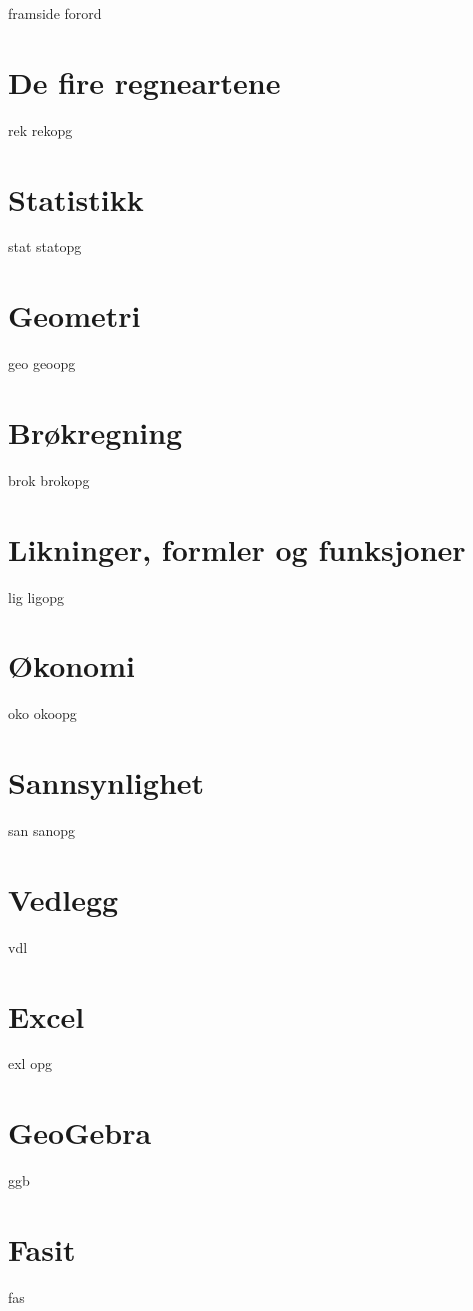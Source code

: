 




{framside}
{forord}

\tableofcontents
\chapter{De fire regneartene}
\newpage
{rek}
{rekopg}

\chapter{Statistikk}
\newpage
{stat}
{statopg}

\chapter{Geometri}
{geo}
{geoopg}

\chapter{Brøkregning \label{Br}}
\newpage
{brok}
\newpage
{brokopg}

\chapter{Likninger, formler og funksjoner \label{Lig}}
{lig}
{ligopg}


\chapter{Økonomi \label{Oko}}
{oko}
{okoopg}

\chapter{Sannsynlighet \label{San}} 
{san}
{sanopg}

\newpage


\chapter*{Vedlegg} 
{vdl}


\chapter*{Excel} 
{exl}	
\newpage
{opg}	


\chapter*{GeoGebra} 
{ggb}	

\chapter*{Fasit}
{fas}






